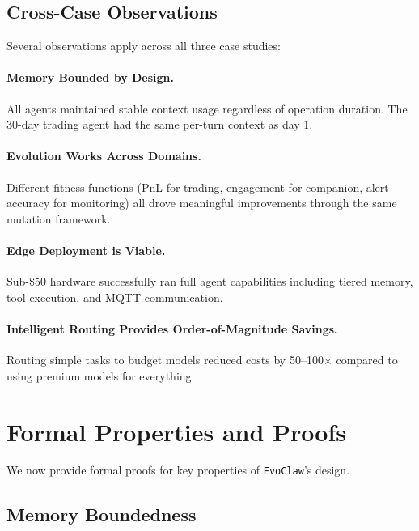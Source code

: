 \documentclass{article}
\newcommand{\evoclaw}{\texttt{EvoClaw}\xspace}
\begin{document}
\subsection{Cross-Case Observations}

Several observations apply across all three case studies:

\paragraph{Memory Bounded by Design.} All agents maintained stable context usage regardless of operation duration. The 30-day trading agent had the same per-turn context as day 1.

\paragraph{Evolution Works Across Domains.} Different fitness functions (PnL for trading, engagement for companion, alert accuracy for monitoring) all drove meaningful improvements through the same mutation framework.

\paragraph{Edge Deployment is Viable.} Sub-\$50 hardware successfully ran full agent capabilities including tiered memory, tool execution, and MQTT communication.

\paragraph{Intelligent Routing Provides Order-of-Magnitude Savings.} Routing simple tasks to budget models reduced costs by 50--100$\times$ compared to using premium models for everything.



\section{Formal Properties and Proofs}
\label{sec:proofs}

We now provide formal proofs for key properties of \evoclaw{}'s design.

\subsection{Memory Boundedness}
\end{document}
